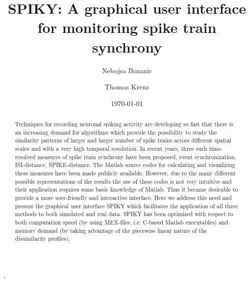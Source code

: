 \documentclass[10pt,twocolumn]{elsart5p}
\begin{document}
\begin{frontmatter}

\title{SPIKY: A graphical user interface for monitoring spike train synchrony}

\author{Nebojsa Bozanic},
\author{Thomas Kreuz}


\address{Institute for complex systems, CNR, Sesto Fiorentino, Italy}


\date{\today}

\begin{abstract}

Techniques for recording neuronal spiking activity are developing so fast that there is an increasing demand for algorithms which provide the possibility to study the similarity patterns of larger and larger number of spike trains across different spatial scales and with a very high temporal resolution. In recent years, three such time-resolved measures of spike train synchrony have been proposed, event synchronization, ISI-distance, SPIKE-distance. The Matlab source codes for calculating and visualizing these measures have been made publicly available. However, due to the many different possible representations of the results the use of these codes is not very intuitive and their application requires some basic knowledge of Matlab. Thus it became desirable to provide a more user-friendly and interactive interface. Here we address this need and present the graphical user interface SPIKY which facilitates the application of all three methods to both simulated and real data. SPIKY has been optimized with respect to both computation speed (by using MEX-files, i.e. C-based Matlab executables) and memory demand (by taking advantage of the piecewise linear nature of the dissimilarity profiles).

\end{abstract}



\end{frontmatter}

\newcommand{\abb}{\small\sf}

%
%
%
%
\end{document}
